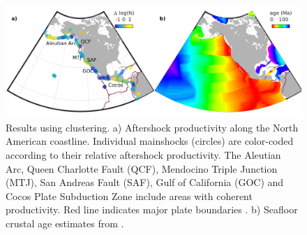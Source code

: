 \documentclass[draft]{agujournal}
\begin{document}

\begin{figure}[H]
    \centering

        \includegraphics[width = \linewidth]{figures/regions_z2008.png}
    
    \caption{Results using \citet{Zaliapin2008} clustering. a) Aftershock productivity along the North American coastline.  Individual mainshocks (circles) are color-coded according to their relative aftershock productivity. The Aleutian Arc, Queen Charlotte Fault (QCF), Mendocino Triple Junction (MTJ), San Andreas Fault (SAF), Gulf of California (GOC) and Cocos Plate Subduction Zone include areas with coherent productivity. Red line indicates major plate boundaries \citep{Bird2003AnBoundaries}. b) Seafloor crustal age estimates from \citet{Muller2008}.}
\end{figure}

\end{document}
